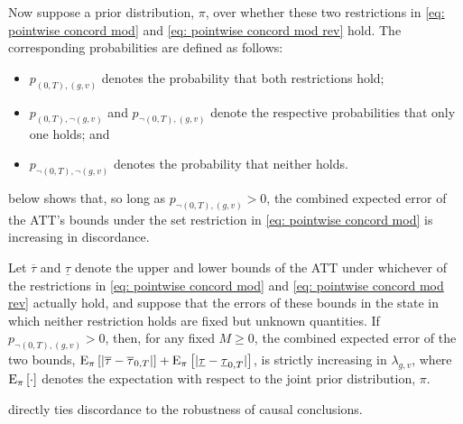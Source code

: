 \documentclass[twoside,11pt]{article}
\begin{document}
Now suppose a prior distribution, $\pi$, over whether these two restrictions in \eqref{eq: pointwise concord mod} and \eqref{eq: pointwise concord mod rev} hold. The corresponding probabilities are defined as follows:
\begin{itemize}
\item $p_{(0,T),(g,v)}$ denotes the probability that both restrictions hold;
\item $p_{(0,T),\neg(g,v)}$ and $p_{\neg(0,T),(g,v)}$ denote the respective probabilities that only one holds; and
\item $p_{\neg(0,T),\neg(g,v)}$ denotes the probability that neither holds.
\end{itemize}
 below shows that, so long as $p_{\neg(0,T),(g,v)} > 0$, the combined expected error of the \textrm{ATT}'s bounds
under the set restriction in \eqref{eq: pointwise concord mod} is increasing
in discordance.
\begin{proposition} \label{prop: concordance}
Let $\overline{\tau}$ and $\underline{\tau}$ denote the upper and lower bounds of the \textrm{ATT} under whichever of the restrictions in \eqref{eq: pointwise concord mod} and \eqref{eq: pointwise concord mod rev} actually hold, and suppose that the errors of these bounds in the state in which neither restriction holds are fixed but unknown quantities. If $p_{\neg(0,T),(g,v)} > 0$, then, for any fixed $M \geq 0$, the combined expected error of the two bounds, $\operatorname{\rm{E}}_{\pi}\left[\lvert\overline{\tau} - \overline{\tau}_{0,T}\rvert\right] + \operatorname{\rm{E}}_{\pi}\left[\lvert\underline{\tau} - \underline{\tau}_{0,T}\rvert\right]$, is strictly increasing in $\lambda_{g,v}$, where $\operatorname{\rm{E}}_{\pi}\left[\cdot\right]$ denotes the expectation with respect to the joint prior distribution, $\pi$.
\end{proposition}
\noindent {} directly ties discordance to the robustness of causal conclusions.
\end{document}
